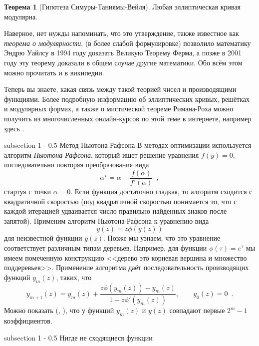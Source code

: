 \documentclass{article}
\makeatletter
\theoremstyle{definition}
\newtheorem*{theorem}{Теорема}
\renewcommand{\subsection}{\@startsection
{subsection}%
{1}%
{\z@}%
{-\baselineskip}%
{0.5\baselineskip}%
{\centering\large\scshape}} %
\makeatother
\begin{document}
\begin{theorem}[Гипотеза Симуры-Таниямы-Вейля]
Любая эллиптическая кривая модулярна.
\end{theorem}
Наверное, нет нужды напоминать, что это утверждение, также известное как \textit{теорема о модулярности}, (в более слабой формулировке) позволило математику Эндрю Уайлсу в 1994 году доказать Великую Теорему Ферма, а позже в 2001 году эту теорему доказали в общем случае другие математики. Обо всём этом можно прочитать и в википедии.

Теперь вы знаете, какая связь между такой теорией чисел и производящими функциями. Более подробную информацию об эллиптических кривых, решётках и модулярных формах, а также о мистической теореме Римана-Роха можно получить из многочисленных онлайн-курсов по этой теме в интернете, например здесь \cite{MF}.

\subsection{Метод Ньютона-Рафсона}
В методах оптимизации используется алгоритм \textit{Ньютона-Рафсона}, который 
ищет решение уравнения \( f(y) = 0 \), последовательно повторяя преобразования 
вида
\[
	\alpha^{\star} = \alpha - \dfrac{f(\alpha)}{f'(\alpha)} \enspace,
\]
стартуя с точки \( \alpha = 0 \). Если функция достаточно гладкая, то алгоритм 
сходится с квадратичной скоростью (под квадратичной скоростью понимается то, что с каждой итерацией удваивается число правильно найденных знаков после запятой). Применим алгоритм Ньютона-Рафсона к 
уравнению вида
\[
	y(z) = z \phi(y(z))
\]
для неизвестной функции \( y(z) \). Позже мы узнаем, что это уравнение 
соответствует различным типам деревьев. Например, для функции \( \phi(\tau) = 
e^{\tau} \) мы имеем помеченную конструкцию <<дерево это корневая вершина и 
множество поддеревьев>>. Применение алгоритма даёт последовательность 
производящих функций \(  y_{m}(z) \), таких, что
\[
	y_{m+1}(z) = y_{m}(z) + \dfrac{z \phi(y_{m}(z)) - y_{m}(z)}{1 - z 
	\phi'(y_m(z))}, \qquad y_0(z) = 0 \enspace .
\]
Можно показать (\cite[I.64, p.88]{ac}, \cite[Section 3.3]{species}), что у функций \( y_{m}(z) \) и \( y(z) 
\) совпадают первые \( 2^m - 1 \) коэффициентов.

\subsection{Нигде не сходящиеся функции}
\end{document}
